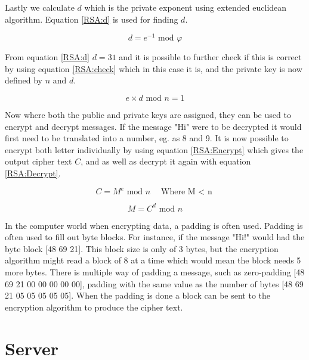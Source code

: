 Lastly we calculate $d$ which is the private exponent using extended euclidean algorithm. Equation \ref{RSA:d} is used for finding $d$.

\begin{equation}
d = e^{-1} \textrm{ mod } \varphi
\label{RSA:d}
\end{equation}

From equation \ref{RSA:d} $d=31$ and it is possible to further check if this is correct by using equation \ref{RSA:check} which in this case it is, and the private key is now defined by $n$ and $d$.

\begin{equation}
e \times d \textrm{ mod } n = 1
\label{RSA:check}
\end{equation}

Now where both the public and private keys are assigned, they can be used to encrypt and decrypt messages. If the message "Hi" were to be decrypted it would first need to be translated into a number, eg. as 8 and 9. It is now possible to encrypt both letter individually by using equation \ref{RSA:Encrypt} which gives the output cipher text $C$, and as well as decrypt it again with equation \ref{RSA:Decrypt}.

\begin{equation}
C=M^e \textrm{ mod } n \quad \textrm{Where M $<$ n}
\label{RSA:Encrypt}
\end{equation}

\begin{equation}
M=C^d \textrm{ mod } n
\label{RSA:Decrypt}
\end{equation}

In the computer world when encrypting data, a padding is often used. Padding is often used to fill out byte blocks. For instance, if the message "Hi!" would had the byte block [48 69 21]. This block size is only of 3 bytes, but the encryption algorithm might read a block of 8 at a time which would mean the block needs 5 more bytes. There is multiple way of padding a message, such as zero-padding [48 69 21 00 00 00 00 00], padding with the same value as the number of bytes [48 69 21 05 05 05 05 05]\cite{PADDING}. When the padding is done a block can be sent to the encryption algorithm to produce the cipher text.

\section{Server}

